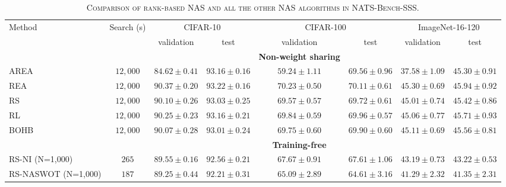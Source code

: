\documentclass[sigconf]{acmart}
\begin{document}
    \begin{table*}[htb]
        \newcommand{\z}{\phantom{0}}
        \caption{\textsc{Comparison of rank-based NAS and all the other NAS algorithms in NATS-Bench-SSS.}}
          \vspace{-\baselineskip}
        \begin{tabular}{@{}lccccccc@{}}\toprule
        Method & Search (s) & \multicolumn{2}{c}{CIFAR-10} & \multicolumn{2}{c}{CIFAR-100} & \multicolumn{2}{c}{ImageNet-16-120} \\ \cmidrule(lr){3-4}\cmidrule(lr){5-6}\cmidrule(lr){7-8}
                            &          & validation       & test             & validation       & test              & validation       & test \\ \midrule
                            &          &                  &                  & \textbf{Non-weight sharing} &        &                  &                  \\
        AREA                & $12,000$ & $84.62 \pm 0.41$ & $93.16 \pm 0.16$ & $59.24 \pm 1.11$ & $69.56 \pm 0.96$  & $37.58 \pm 1.09$ & $45.30 \pm 0.91$ \\
        REA                 & $12,000$ & $90.37 \pm 0.20$ & $93.22 \pm 0.16$ & $70.23 \pm 0.50$ & $70.11 \pm 0.61$  & $45.30 \pm 0.69$ & $45.94 \pm 0.92$ \\
        RS                  & $12,000$ & $90.10 \pm 0.26$ & $93.03 \pm 0.25$ & $69.57 \pm 0.57$ & $69.72 \pm 0.61$  & $45.01 \pm 0.74$ & $45.42 \pm 0.86$ \\
        RL                  & $12,000$ & $90.25 \pm 0.23$ & $93.16 \pm 0.21$ & $69.84 \pm 0.59$ & $69.96 \pm 0.57$  & $45.06 \pm 0.77$ & $45.71 \pm 0.93$ \\
        BOHB                & $12,000$ & $90.07 \pm 0.28$ & $93.01 \pm 0.24$ & $69.75 \pm 0.60$ & $69.90 \pm 0.60$  & $45.11 \pm 0.69$ & $45.56 \pm 0.81$ \\ \midrule
                            &          &                  &                  & \textbf{Training-free} &             &                  &                  \\
        RS-NI (N=1,000)         & $265$& $89.55 \pm 0.16$ & $92.56 \pm 0.21$ & $67.67 \pm 0.91$ & $67.61 \pm 1.06$  & $43.19 \pm 0.73$ & $43.22 \pm 0.53$ \\ 
        RS-NASWOT (N=1,000)     & $187$& $89.25 \pm 0.44$ & $92.21 \pm 0.31$ & $65.09 \pm 2.89$ & $64.61 \pm 3.16$  & $41.29 \pm 2.32$ & $41.35 \pm 2.31$ \\ 

\end{tabular}
\end{table*}
\end{document}
